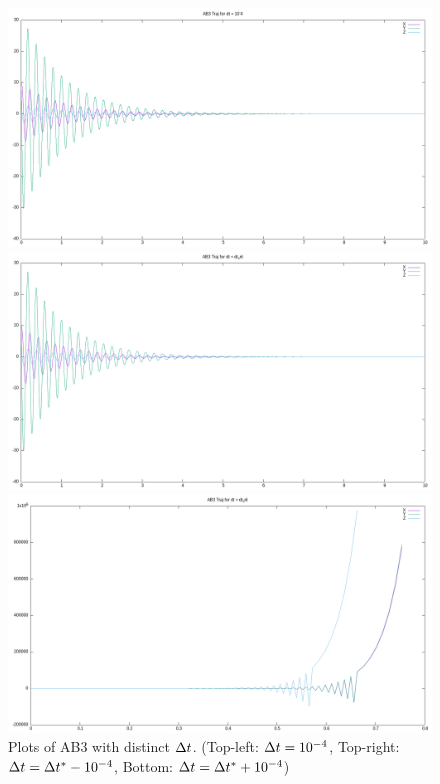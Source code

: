 \documentclass{article}
\begin{document}
\begin{enumerate}[label=\alph*)]
  \begin{figure}
    \centering
    \begin{minipage}{0.48\textwidth}
        \centering
        \includegraphics[width=1\textwidth]{1cdt=10-4.png}
    \end{minipage}
    \begin{minipage}{0.48\textwidth}
        \centering
        \includegraphics[width=1\textwidth]{1cdt<dt_crit.png}
    \end{minipage}

    \begin{minipage}{0.6\textwidth}
        \centering
        \includegraphics[width=1\textwidth]{1cdt>dt_crit.png}
    \end{minipage}
    \caption{Plots of AB3 with distinct $\Delta t$. (Top-left: $\Delta t = 10^{-4}$, 
    Top-right: $\Delta t = \Delta t^* - 10^{-4}$, Bottom: $\Delta t = \Delta t^* +10^{-4}$)}
  \end{figure}

\end{enumerate}
\end{document}
